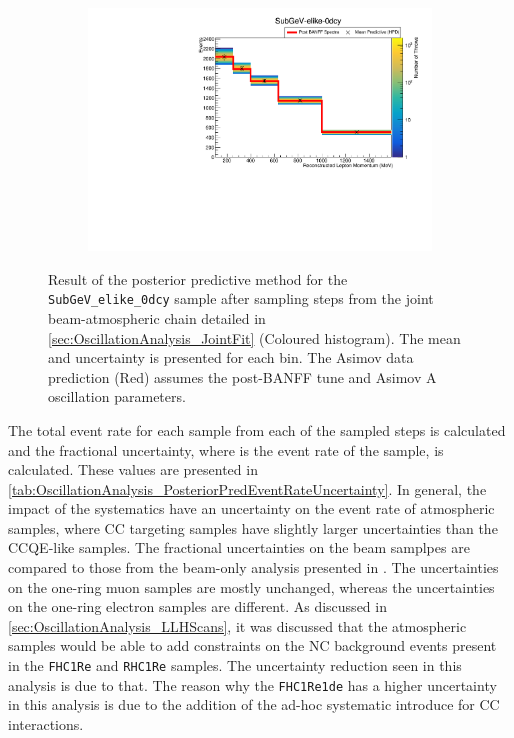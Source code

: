 \begin{figure}[h]
  \begin{subfigure}[t]{0.98\textwidth}
    \includegraphics[width=\textwidth, trim={0mm 0mm 0mm 0mm}, clip,page=1]{Figures/OA/Predictive_AllSyst.pdf}
  \end{subfigure}
  \caption{Result of the posterior predictive method for the \texttt{SubGeV\_elike\_0dcy} sample after sampling  steps from the joint beam-atmospheric chain detailed in \autoref{sec:OscillationAnalysis_JointFit} (Coloured histogram). The mean and uncertainty is presented for each bin. The Asimov data prediction (Red) assumes the post-BANFF tune and Asimov A oscillation parameters.}
  \label{fig:OscillationAnalysis_PosteriorPredictive_SG_elike0dcy}
\end{figure}

The total event rate for each sample from each of the sampled steps is calculated and the fractional uncertainty,  where  is the event rate of the  sample, is calculated. These values are presented in \autoref{tab:OscillationAnalysis_PosteriorPredEventRateUncertainty}. In general, the impact of the systematics have an  uncertainty on the event rate of atmospheric samples, where CC\quickmath{1\pi} targeting samples have slightly larger uncertainties than the CCQE-like samples.
The fractional uncertainties on the beam samplpes are compared to those from the beam-only analysis presented in \cite{Dunne2020-uf, t2k_tn_393}. The uncertainties on the one-ring muon samples are mostly unchanged, whereas the uncertainties on the one-ring electron samples are different. As discussed in \autoref{sec:OscillationAnalysis_LLHScans}, it was discussed that the atmospheric samples would be able to add constraints on the NC background events present in the \texttt{FHC1Re} and \texttt{RHC1Re} samples. The uncertainty reduction seen in this analysis is due to that. The reason why the \texttt{FHC1Re1de} has a higher uncertainty in this analysis is due to the addition of the ad-hoc systematic introduce for CC\quickmath{1\pi} interactions.

